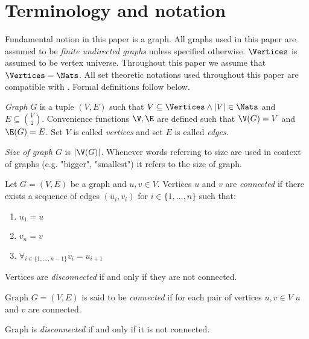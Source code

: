 
\section{Terminology and notation}

Fundamental notion in this paper is a graph. All graphs used in this paper are assumed to be \emph{finite undirected graphs} unless specified otherwise. $\Vertices$ is assumed to be vertex universe. Throughout this paper we assume that $\Vertices = \Nats$. All set theoretic notations used throughout this paper are compatible with \cite{jech}. Formal definitions follow below.

\begin{defi}
    \emph{Graph} $G$ is a tuple $(V,E)$ such that $V \subseteq \Vertices \land |V| \in \Nats$ and $E \subseteq \binom{V}{2}$. Convenience functions $\V, \E$ are defined such that $\V(G) = V$ and $\E(G) = E$. Set $V$ is called \emph{vertices} and set $E$ is called \emph{edges}.
\end{defi}

\begin{defi}
    \emph{Size of graph $G$} is $|\V(G)|$. Whenever words referring to size are used in context of graphs (e.g. "bigger", "smallest") it refers to the size of graph.
\end{defi}

\begin{defi}
    Let $G = (V,E)$ be a graph and $u, v \in V$. Vertices $u$ and $v$ are \emph{connected} if there exists a sequence of edges $(u_i,v_i)$ for $i \in \{1, \ldots, n\}$ such that:
    \begin{enumerate}
        \item $u_1 = u$
        \item $v_n = v$
        \item $\forall_{i \in \{1, \ldots, n - 1\}} v_i = u_{i+1}$
    \end{enumerate}

    Vertices are \emph{disconnected} if and only if they are not connected.
\end{defi}

\begin{defi}
    Graph $G = (V,E)$ is said to be \emph{connected} if for each pair of vertices $u,v \in V$ $u$ and $v$ are connected.

    Graph is \emph{disconnected} if and only if it is not connected.
\end{defi}

